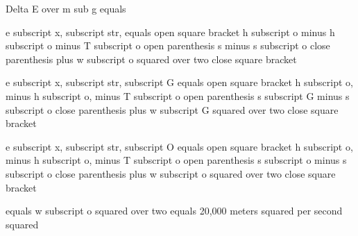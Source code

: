 Delta E over m sub g equals

e subscript x, subscript str, equals open square bracket h subscript o minus h subscript o minus T subscript o open parenthesis s minus s subscript o close parenthesis plus w subscript o squared over two close square bracket

e subscript x, subscript str, subscript G equals open square bracket h subscript o, minus h subscript o, minus T subscript o open parenthesis s subscript G minus s subscript o close parenthesis plus w subscript G squared over two close square bracket

e subscript x, subscript str, subscript O equals open square bracket h subscript o, minus h subscript o, minus T subscript o open parenthesis s subscript o minus s subscript o close parenthesis plus w subscript o squared over two close square bracket

equals w subscript o squared over two equals 20,000 meters squared per second squared
